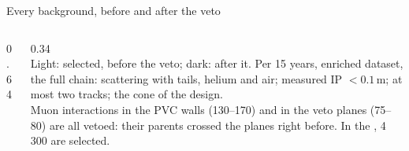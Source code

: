 \begin{frame}{Every background, before and after the veto}
  \begin{columns}[c]
    \begin{column}{0.64\textwidth}
      \\[1mm]
    \end{column}
    \begin{column}{0.34\textwidth}
      \\[2mm]\footnotesize
      Light: selected, before the veto; dark: after it. Per 15 years, enriched dataset, the full chain: scattering with tails, helium and air; measured IP $<0.1$\,m; at most two tracks; the cone of the design.\\[1.5mm]
      Muon interactions in the PVC walls (130--170) and in the veto planes (75--80) are all vetoed: their parents crossed the planes right before. In the , 4\,300 are selected.\\[1.5mm]
    \end{column}
  \end{columns}
\end{frame}

